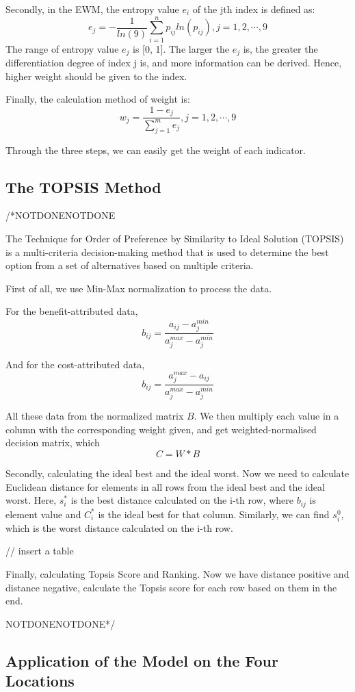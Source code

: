 Secondly, in the EWM, the entropy value $e_i$ of the jth index is defined as:$$e_j=-\frac{1}{ln(9)}\sum_{i=1}^np_{ij}ln(p_{ij}),j=1,2,\cdots,9$$
The range of entropy value $e_j$ is [0, 1]. The larger the $e_j$ is, the greater the differentiation degree of index j is, and more information can be derived. Hence, higher weight should be given to the index. 

Finally, the calculation method of weight is:$$w_j=\frac{1-e_j}{\sum_{j=1}^me_j},j=1,2,\cdots,9$$

Through the three steps, we can easily get the weight of each indicator.


\subsection{The TOPSIS Method}
/*NOTDONENOTDONE

The Technique for Order of Preference by Similarity to Ideal Solution (TOPSIS) is a multi-criteria decision-making method that is used to determine the best option from a set of alternatives based on multiple criteria. 

First of all, we use Min-Max normalization to process the data.

For the benefit-attributed data,
$$b_{ij}=\frac{a_{ij}-a_j^{min}}{a_j^{max}-a_j^{min}}$$

And for the cost-attributed data,
$$b_{ij}=\frac{a_{j}^{max}-a_{ij}}{a_j^{max}-a_j^{min}}$$

All these data from the normalized matrix $B$. We then multiply each value in a column with the corresponding weight given, and get weighted-normalised decision matrix, which $$C=W*B$$

Secondly, calculating the ideal best and the ideal worst. Now we need to calculate Euclidean distance for elements in all rows from the ideal best and the ideal worst. Here, $s_i^*$ is the best distance calculated on the i-th row, where $b_{ij}$ is element value and $C_i^{*}$ is the ideal best for that column. Similarly, we can find $s_i^0$, which is the worst distance calculated on the i-th row.

// insert a table

Finally, calculating Topsis Score and Ranking. Now we have distance positive and distance negative, calculate the Topsis score for each row based on them in the end.

NOTDONENOTDONE*/


\subsection{Application of the Model on the Four Locations}


